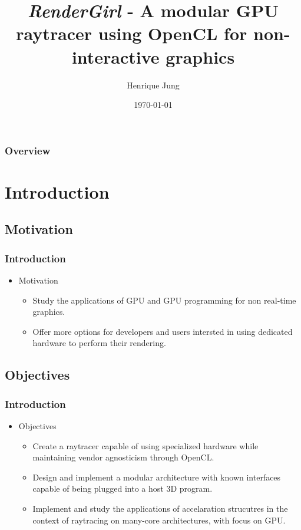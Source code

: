 \documentclass{beamer}
\title[RenderGirl]{\emph{RenderGirl} - A modular GPU raytracer using OpenCL for non-interactive graphics}
\author{Henrique Jung}
\institute[Unisinos]
{
Universidade do Vale do Rio dos Sinos \\
\medskip
\textit{henriquenj@gmail.com}
}
\date{\today}
\begin{document}
\begin{frame}
\titlepage %
\end{frame}

\begin{frame}
\frametitle{Overview}
\tableofcontents
\end{frame}

\section{Introduction}

\subsection{Motivation}
\begin{frame}
\frametitle{Introduction}

\begin{itemize}
\item Motivation

\begin{itemize}
\item Study the applications of GPU and GPU programming for non
  real-time graphics.
\item Offer more options for developers and users intersted in using
  dedicated hardware to perform their rendering.
\end{itemize}

\end{itemize}
\end{frame}


\subsection{Objectives}
\begin{frame}
\frametitle{Introduction}

\begin{itemize}
\item Objectives
\begin{itemize}
\item Create a raytracer capable of using specialized hardware while
  maintaining vendor agnosticism through OpenCL.
\item Design and implement a modular architecture with known
  interfaces capable of being plugged into a host 3D program.
\item Implement and study the applications of accelaration strucutres
  in the context of raytracing on many-core architectures, with focus
  on GPU.
\end{itemize}
\end{itemize}

\end{frame}
\end{document}
